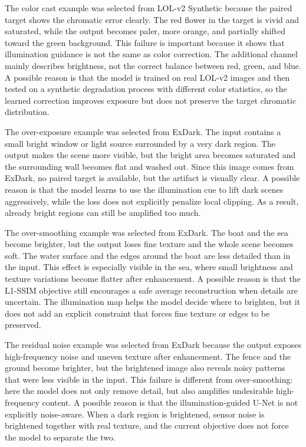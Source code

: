 The color cast example was selected from LOL-v2 Synthetic because the paired target shows the chromatic error clearly. The red flower in the target is vivid and saturated, while the output becomes paler, more orange, and partially shifted toward the green background. This failure is important because it shows that illumination guidance is not the same as color correction. The additional channel mainly describes brightness, not the correct balance between red, green, and blue. A possible reason is that the model is trained on real LOL-v2 images and then tested on a synthetic degradation process with different color statistics, so the learned correction improves exposure but does not preserve the target chromatic distribution.

The over-exposure example was selected from ExDark. The input contains a small bright window or light source surrounded by a very dark region. The output makes the scene more visible, but the bright area becomes saturated and the surrounding wall becomes flat and washed out. Since this image comes from ExDark, no paired target is available, but the artifact is visually clear. A possible reason is that the model learns to use the illumination cue to lift dark scenes aggressively, while the loss does not explicitly penalize local clipping. As a result, already bright regions can still be amplified too much.

The over-smoothing example was selected from ExDark. The boat and the sea become brighter, but the output loses fine texture and the whole scene becomes soft. The water surface and the edges around the boat are less detailed than in the input. This effect is especially visible in the sea, where small brightness and texture variations become flatter after enhancement. A possible reason is that the L1-SSIM objective still encourages a safe average reconstruction when details are uncertain. The illumination map helps the model decide where to brighten, but it does not add an explicit constraint that forces fine texture or edges to be preserved.

The residual noise example was selected from ExDark because the output exposes high-frequency noise and uneven texture after enhancement. The fence and the ground become brighter, but the brightened image also reveals noisy patterns that were less visible in the input. This failure is different from over-smoothing: here the model does not only remove detail, but also amplifies undesirable high-frequency content. A possible reason is that the illumination-guided U-Net is not explicitly noise-aware. When a dark region is brightened, sensor noise is brightened together with real texture, and the current objective does not force the model to separate the two.

